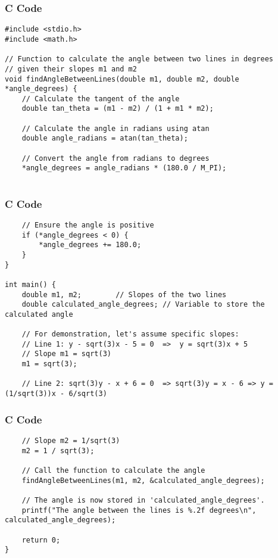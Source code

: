 \documentclass{beamer}
\begin{document}
\begin{frame}[fragile]
\frametitle{C Code}
\begin{lstlisting}
#include <stdio.h>
#include <math.h>

// Function to calculate the angle between two lines in degrees
// given their slopes m1 and m2
void findAngleBetweenLines(double m1, double m2, double *angle_degrees) {
    // Calculate the tangent of the angle
    double tan_theta = (m1 - m2) / (1 + m1 * m2);

    // Calculate the angle in radians using atan
    double angle_radians = atan(tan_theta);

    // Convert the angle from radians to degrees
    *angle_degrees = angle_radians * (180.0 / M_PI);
    
\end{lstlisting}
\end{frame}
\begin{frame}[fragile]
\frametitle{C Code }
\begin{lstlisting}
    // Ensure the angle is positive
    if (*angle_degrees < 0) {
        *angle_degrees += 180.0;
    }
}

int main() {
    double m1, m2;        // Slopes of the two lines
    double calculated_angle_degrees; // Variable to store the calculated angle

    // For demonstration, let's assume specific slopes:
    // Line 1: y - sqrt(3)x - 5 = 0  =>  y = sqrt(3)x + 5
    // Slope m1 = sqrt(3)
    m1 = sqrt(3);

    // Line 2: sqrt(3)y - x + 6 = 0  => sqrt(3)y = x - 6 => y = (1/sqrt(3))x - 6/sqrt(3)
    \end{lstlisting}
\end{frame}
\begin{frame}[fragile]
\frametitle{C Code }
\begin{lstlisting}
    // Slope m2 = 1/sqrt(3)
    m2 = 1 / sqrt(3);

    // Call the function to calculate the angle
    findAngleBetweenLines(m1, m2, &calculated_angle_degrees);

    // The angle is now stored in 'calculated_angle_degrees'.
    printf("The angle between the lines is %.2f degrees\n", calculated_angle_degrees);
    
    return 0;
}
\end{lstlisting}
\end{frame}
\end{document}
